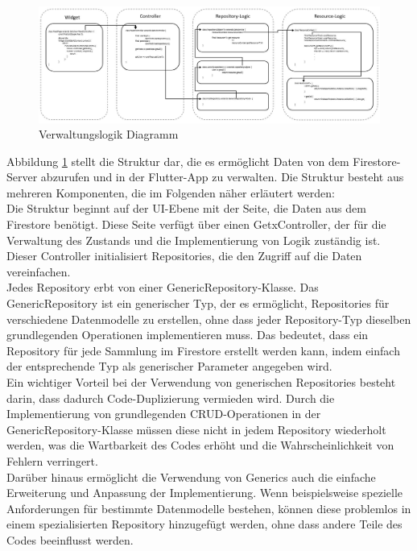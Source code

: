 \begin{figure}[H]
  \centering
  \includegraphics[width=1\textwidth]{pics/Management-Logic.JPG}
  \caption{Verwaltungslogik Diagramm}
  \label{fig:management-logic-diagram}
\end{figure}

Abbildung \ref{fig:management-logic-diagram} stellt die Struktur dar, die es ermöglicht Daten von dem Firestore-Server abzurufen und in der Flutter-App zu verwalten. Die Struktur besteht aus mehreren Komponenten, die im Folgenden näher erläutert werden:
\\
Die Struktur beginnt auf der UI-Ebene mit der Seite, die Daten aus dem Firestore benötigt. Diese Seite verfügt über einen GetxController, der für die Verwaltung des Zustands und die Implementierung von Logik zuständig ist. Dieser Controller initialisiert Repositories, die den Zugriff auf die Daten vereinfachen.
\\
Jedes Repository erbt von einer GenericRepository-Klasse. Das GenericRepository ist ein generischer Typ, der es ermöglicht, Repositories für verschiedene Datenmodelle zu erstellen, ohne dass jeder Repository-Typ dieselben grundlegenden Operationen implementieren muss. Das bedeutet, dass ein Repository für jede Sammlung im Firestore erstellt werden kann, indem einfach der entsprechende Typ als generischer Parameter angegeben wird.
\\
Ein wichtiger Vorteil bei der Verwendung von generischen Repositories besteht darin, dass dadurch Code-Duplizierung vermieden wird. Durch die Implementierung von grundlegenden CRUD-Operationen in der GenericRepository-Klasse müssen diese nicht in jedem Repository wiederholt werden, was die Wartbarkeit des Codes erhöht und die Wahrscheinlichkeit von Fehlern verringert.
\\
Darüber hinaus ermöglicht die Verwendung von Generics auch die einfache Erweiterung und Anpassung der Implementierung. Wenn beispielsweise spezielle Anforderungen für bestimmte Datenmodelle bestehen, können diese problemlos in einem spezialisierten Repository hinzugefügt werden, ohne dass andere Teile des Codes beeinflusst werden.
